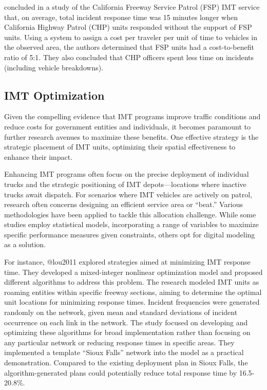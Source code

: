 \documentclass[
  letterpaper,
  authoryear]{elsarticle}
\begin{document}
\citet{skabardonis1998} concluded in a study of the California Freeway
Service Patrol (FSP) IMT service that, on average, total incident
response time was 15 minutes longer when California Highway Patrol (CHP)
units responded without the support of FSP units. Using a system to
assign a cost per traveler per unit of time to vehicles in the observed
area, the authors determined that FSP units had a cost-to-benefit ratio
of 5:1. They also concluded that CHP officers spent less time on
incidents (including vehicle breakdowns).~

\hypertarget{imt-optimization}{%
\subsection{IMT Optimization}\label{imt-optimization}}

Given the compelling evidence that IMT programs improve traffic
conditions and reduce costs for government entities and individuals, it
becomes paramount to further research avenues to maximize these
benefits. One effective strategy is the strategic placement of IMT
units, optimizing their spatial effectiveness to enhance their impact.

Enhancing IMT programs often focus on the precise deployment of
individual trucks and the strategic positioning of IMT
depots---locations where inactive trucks await dispatch. For scenarios
where IMT vehicles are actively on patrol, research often concerns
designing an efficient service area or ``beat.'' Various methodologies
have been applied to tackle this allocation challenge. While some
studies employ statistical models, incorporating a range of variables to
maximize specific performance measures given constraints, others opt for
digital modeling as a solution.

For instance, @lou2011 explored strategies aimed at minimizing IMT
response time. They developed a mixed-integer nonlinear optimization
model and proposed different algorithms to address this problem. The
research modeled IMT units as roaming entities within specific freeway
sections, aiming to determine the optimal unit locations for minimizing
response times. Incident frequencies were generated randomly on the
network, given mean and standard deviations of incident occurrence on
each link in the network. The study focused on developing and optimizing
these algorithms for broad implementation rather than focusing on any
particular network or reducing response times in specific areas. They
implemented a template ``Sioux Falls'' network into the model as a
practical demonstration. Compared to the existing deployment plan in
Sioux Falls, the algorithm-generated plans could potentially reduce
total response time by 16.5-20.8\%.
\end{document}
